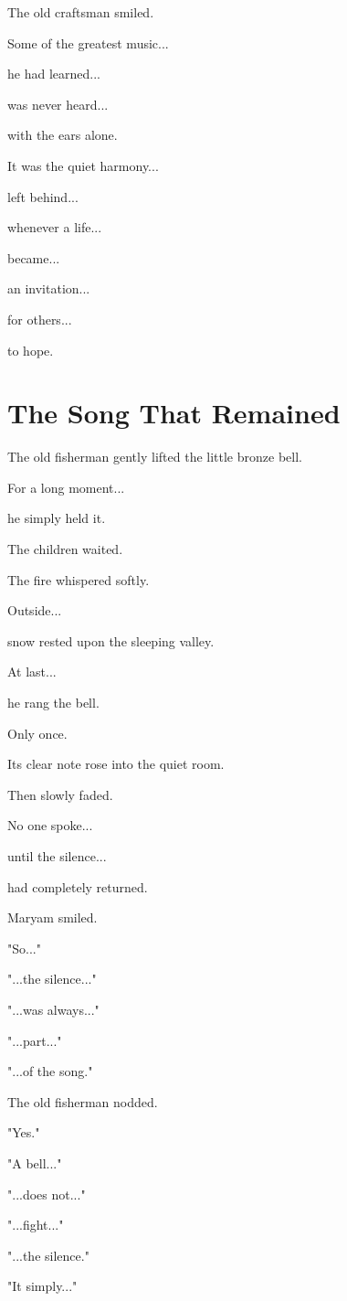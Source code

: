 \documentclass[12pt,openany]{book}
\begin{document}
The old craftsman smiled.

Some of the greatest music...

he had learned...

was never heard...

with the ears alone.

It was the quiet harmony...

left behind...

whenever a life...

became...

an invitation...

for others...

to hope.
\section*{The Song That Remained}

The old fisherman gently lifted the little bronze bell.

For a long moment...

he simply held it.

The children waited.

The fire whispered softly.

Outside...

snow rested upon the sleeping valley.

At last...

he rang the bell.

Only once.

Its clear note rose into the quiet room.

Then slowly faded.

No one spoke...

until the silence...

had completely returned.

Maryam smiled.

"So..."

"...the silence..."

"...was always..."

"...part..."

"...of the song."

The old fisherman nodded.

"Yes."

"A bell..."

"...does not..."

"...fight..."

"...the silence."

"It simply..."
\end{document}
